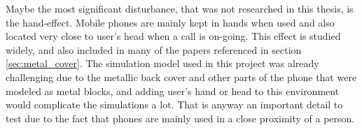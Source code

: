 Maybe the most significant disturbance, that was not researched in this thesis, is the hand-effect. Mobile phones are mainly kept in hands when used and also located very close to user's head when a call is on-going. This effect is studied widely, and also included in many of the papers referenced in section \ref{sec:metal_cover}. The simulation model used in this project was already challenging due to the metallic back cover and other parts of the phone that were modeled as metal blocks, and adding user's hand or head to this environment would complicate the simulations a lot. That is anyway an important detail to test due to the fact that phones are mainly used in a close proximity of a person.


\clearpage